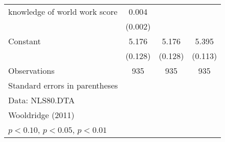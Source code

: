 \begin{table}[htbp]
\begin{tabular}{l*{3}{c}}
knowledge of world work score&       0.004\sym{**} &                     &                     \\
                    &     (0.002)         &                     &                     \\
\addlinespace
Constant            &       5.176\sym{***}&       5.176\sym{***}&       5.395\sym{***}\\
                    &     (0.128)         &     (0.128)         &     (0.113)         \\
\midrule
Observations        &         935         &         935         &         935         \\
\bottomrule
\multicolumn{4}{l}{\footnotesize Standard errors in parentheses}\\
\multicolumn{4}{l}{\footnotesize Data: NLS80.DTA}\\
\multicolumn{4}{l}{\footnotesize Wooldridge (2011)}\\
\multicolumn{4}{l}{\footnotesize \sym{*} \(p<0.10\), \sym{**} \(p<0.05\), \sym{***} \(p<0.01\)}\\
\end{tabular}
\end{table}
